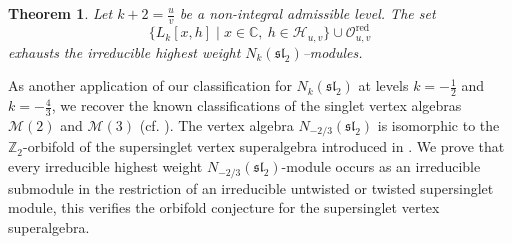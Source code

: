 \documentclass[11 pt]{amsart}
\newtheorem{theorem}{Theorem}
\theoremstyle{definition}
\theoremstyle{plain}
\begin{document}
\begin{theorem}
Let $k+2 = \frac{u}{v}$ be a non-integral admissible level. The set
\[
 \{L_k[x,h]\mid x\in\mathbb C,\ h\in\mathcal H_{u,v}\}
 \cup\mathcal O^{\mathrm{red}}_{u,v}
\]
exhausts the irreducible highest weight
$N_k(\mathfrak{sl}_2)$--modules.
\end{theorem}
As another application of our classification for $N_k(\mathfrak{sl}_2)$ at levels $k=-\frac{1}{2}$ and $k=-\frac{4}{3}$, we recover the known
classifications of the singlet vertex algebras $\mathcal M(2)$ and $\mathcal M(3)$ (cf. \cite{A-2003, WangW3}).
The vertex  algebra $N_{-2/3}(\mathfrak{sl}_2)$ is isomorphic to the
$\mathbb Z_2$-orbifold of the supersinglet vertex superalgebra introduced in
\cite{AMSuperTriplet}. We prove that every irreducible highest weight
$N_{-2/3}(\mathfrak{sl}_2)$-module occurs as an irreducible submodule in
the restriction of an irreducible untwisted or twisted supersinglet
module, this verifies the orbifold conjecture for the supersinglet vertex superalgebra.
\end{document}
